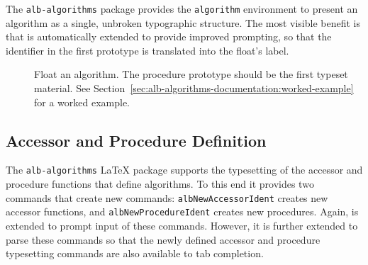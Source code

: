 \documentclass[11pt,a4paper,oneside,titlepage]{alb-corp}
\begin{document}
The \texttt{alb-algorithms} package provides the \texttt{algorithm}
environment to present an algorithm as a single, unbroken typographic
structure.  The most visible benefit is that \AUCTeX{} is automatically
extended to provide improved prompting, so that the identifier in the
first prototype is translated into the float's label.

\begin{description}
\item[] Float an algorithm.  The procedure
  prototype should be the first typeset material.  See
  Section~\ref{sec:alb-algorithms-documentation:worked-example} for a
  worked example.
\end{description}



\subsection{Accessor and Procedure Definition}
\label{sec:alb-algorithms-documentation:accessor-proc-defin}

The \texttt{alb-algorithms} \LaTeX{} package supports the typesetting of
the accessor and procedure functions that define algorithms.  To this
end it provides two commands that create new commands:
\texttt{albNewAccessorIdent} creates new accessor functions, and
\texttt{albNewProcedureIdent} creates new procedures.  Again, \AUCTeX{}
is extended to prompt input of these commands.  However, it is further
extended to parse these commands so that the newly defined accessor and
procedure typesetting commands are also available to tab completion.
\end{document}
